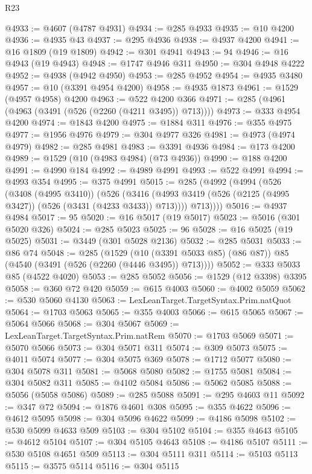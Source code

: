 \begin{lexlean}{R23}
\begin{coremodule}
@4933 := @4607 (@4787 @4931)
@4934 := @285 @4933
@4935 := @10 @4200
@4936 := @4935 @43
@4937 := @295 @4936
@4938 := @4937 @4200
@4941 := @16 @1809 (@19 @1809)
@4942 := @301 @4941
@4943 := 94
@4946 := @16 @4943 (@19 @4943)
@4948 := @1747 @4946 @311
@4950 := @304 @4948 @4222
@4952 := @4938 (@4942 @4950)
@4953 := @285 @4952
@4954 := @4935 @3480
@4957 := @10 (@3391 @4954 @4200)
@4958 := @4935 @1873
@4961 := @1529 (@4957 @4958) @4200
@4963 := @522 @4200 @366
@4971 := @285 (@4961 (@4963 (@3491 (@526 (@2260 (@4211 @3495)) @713))))
@4973 := @333 @4954 @4200
@4974 := @1843 @4200
@4975 := @1884 @311
@4976 := @355 @4975
@4977 := @1956 @4976
@4979 := @304 @4977 @326
@4981 := @4973 (@4974 @4979)
@4982 := @285 @4981
@4983 := @3391 @4936
@4984 := @173 @4200
@4989 := @1529 (@10 (@4983 @4984) (@73 @4936))
@4990 := @188 @4200
@4991 := @4990 @184
@4992 := @4989 @4991
@4993 := @522 @4991
@4994 := @4993 @354
@4995 := @375 @4991
@5015 := @285
    (@4992
      (@4994
        (@526
          (@3408 (@4995 @3410))
          (@526
            (@3416 (@4993 @3419 (@526 (@2125 (@4995 @3427)) (@526 (@3431 (@4233 @3433)) @713))))
            @713))))
@5016 := @4937 @4984
@5017 := 95
@5020 := @16 @5017 (@19 @5017)
@5023 := @5016 (@301 @5020 @326)
@5024 := @285 @5023
@5025 := 96
@5028 := @16 @5025 (@19 @5025)
@5031 := @3449 (@301 @5028 @2136)
@5032 := @285 @5031
@5033 := @86 @74
@5048 := @285
    (@1529 (@10 (@3391 @5033 @85) (@86 @87)) @85 (@4540 (@3491 (@526 (@2260 (@4446 @3495)) @713))))
@5052 := @333 @5033 @85 (@4522 @4020)
@5053 := @285 @5052
@5056 := @1529 (@12 @3398) @3395
@5058 := @360 @72 @420
@5059 := @615 @4003
@5060 := @4002 @5059
@5062 := @530 @5060 @4130
@5063 := LexLeanTarget.TargetSyntax.Prim.natQuot
@5064 := @1703 @5063
@5065 := @355 @4003
@5066 := @615 @5065
@5067 := @5064 @5066
@5068 := @304 @5067
@5069 := LexLeanTarget.TargetSyntax.Prim.natRem
@5070 := @1703 @5069
@5071 := @5070 @5066
@5073 := @304 @5071 @311
@5074 := @309 @5073
@5075 := @4011 @5074
@5077 := @304 @5075 @369
@5078 := @1712 @5077
@5080 := @304 @5078 @311
@5081 := @5068 @5080
@5082 := @1755 @5081
@5084 := @304 @5082 @311
@5085 := @4102 @5084
@5086 := @5062 @5085
@5088 := @5056 (@5058 @5086)
@5089 := @285 @5088
@5091 := @295 @4603 @11
@5092 := @347 @72
@5094 := @1876 @4601 @308
@5095 := @355 @4622
@5096 := @4612 @5095
@5098 := @304 @5096 @4622
@5099 := @4186 @5098
@5102 := @530 @5099 @4633 @509
@5103 := @304 @5102
@5104 := @355 @4643
@5105 := @4612 @5104
@5107 := @304 @5105 @4643
@5108 := @4186 @5107
@5111 := @530 @5108 @4651 @509
@5113 := @304 @5111 @311
@5114 := @5103 @5113
@5115 := @3575 @5114
@5116 := @304 @5115

\end{coremodule}
\end{lexlean}

